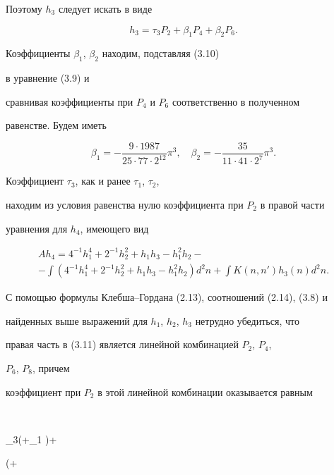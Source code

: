Поэтому $h_3$ следует искать в виде


\begin{equation}


h_3=\tau_3P_2+\beta_1P_4+\beta_2P_6.


\tag{3.10}


\end{equation}


Коэффициенты $\beta_1$, $\beta_2$ находим, подставляя (3.10)


в уравнение (3.9) и


сравнивая коэффициенты при $P_4$ и $P_6$ соответственно в полученном


равенстве. Будем иметь


$$


\beta_1=-\frac{9\cdot 1987}{25\cdot 77\cdot 2^{12}}\pi^3,\quad


\beta_2=-\frac{35}{11\cdot 41\cdot 2^7}\pi^3.


$$





Коэффициент $\tau_3$, как и ранее $\tau_1$, $\tau_2$,


находим из условия равенства нулю коэффициента при $P_2$ в правой части


уравнения для $h_4$, имеющего вид


\begin{multline}


Ah_4=4^{-1}h^4_1+2^{-1}h^2_2+h_1h_3-h^2_1h_2-\\


-\int(4^{-1}h^4_1+2^{-1}h^2_2+h_1h_3-h^2_1h_2)d^2n+


\int K(n,n')h_3(n)d^2n.


\tag{3.11}


\end{multline}


С помощью формулы Клебша--Гордана (2.13), соотношений (2.14), (3.8) и


найденных выше выражений для $h_1$, $h_2$, $h_3$ нетрудно убедиться, что


правая часть в (3.11) является линейной комбинацией $P_2$, $P_4$,


$P_6$, $P_8$, причем


коэффициент при $P_2$ в этой линейной комбинации оказывается равным


$$


\tau_3\biggl(+\tau_1 \biggr)+


\biggl(+


